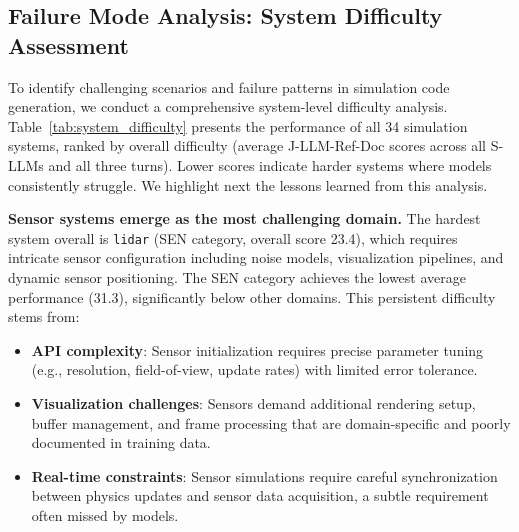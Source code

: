 


\subsection{Failure Mode Analysis: System Difficulty Assessment}
\label{subsec:failure_mode}

To identify challenging scenarios and failure patterns in simulation code generation, we conduct a comprehensive system-level difficulty analysis. Table~\ref{tab:system_difficulty} presents the performance of all 34 simulation systems, ranked by overall difficulty (average J-LLM-Ref-Doc scores across all S-LLMs and all three turns). Lower scores indicate harder systems where models consistently struggle. We highlight next the lessons learned from this analysis.

\textbf{Sensor systems emerge as the most challenging domain.}
The hardest system overall is \texttt{lidar} (SEN category, overall score 23.4), which requires intricate sensor configuration including noise models, visualization pipelines, and dynamic sensor positioning. The SEN category achieves the lowest average performance (31.3), significantly below other domains. This persistent difficulty stems from:

\begin{itemize}
    \item \textbf{API complexity}: Sensor initialization requires precise parameter tuning (e.g., resolution, field-of-view, update rates) with limited error tolerance.
    \item \textbf{Visualization challenges}: Sensors demand additional rendering setup, buffer management, and frame processing that are domain-specific and poorly documented in training data.
    \item \textbf{Real-time constraints}: Sensor simulations require careful synchronization between physics updates and sensor data acquisition, a subtle requirement often missed by models.
\end{itemize}


